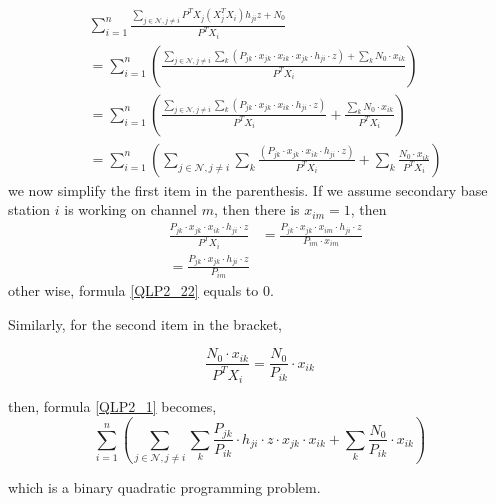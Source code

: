 \begin{appendices}
	\begin{equation}	
\label{QLP2_1}
		\begin{aligned}
		& \sum\limits^{n}_{i=1} \frac{\sum\limits_{j\in\mathcal{N}, j\neq i}P^TX_j(X_j^TX_i)h_{ji}z + N_0}{P^TX_i}\\
		& =\sum\limits^{n}_{i=1}( \frac{\sum\limits_{j\in\mathcal{N}, j\neq i}\sum\limits_k (P_{jk}\cdot x_{jk}\cdot x_{ik}\cdot x_{jk}\cdot h_{ji}\cdot z) + \sum\limits_k N_0\cdot x_{i k}}{P^TX_i})\\
		& =\sum\limits^{n}_{i=1}( \frac{\sum\limits_{j\in\mathcal{N}, j\neq i}\sum\limits_k (P_{jk}\cdot x_{jk}\cdot x_{ik}\cdot h_{ji}\cdot z)}{P^TX_i}  + \frac{\sum\limits_k N_0\cdot x_{ik}}{P^TX_i})\\
		& =\sum\limits^{n}_{i=1}( \sum\limits_{j\in\mathcal{N}, j\neq i}\sum\limits_k \frac{(P_{jk}\cdot x_{jk}\cdot x_{ik}\cdot h_{ji}\cdot z)}{P^TX_i}  + \sum\limits_k\frac{N_0\cdot x_{ik}}{P^TX_i})
		\end{aligned}
	\end{equation}
we now simplify the first item in the parenthesis. If we assume secondary base station $i$ is working on channel $m$, then there is $x_{im}=1$, then 
	\begin{equation}
\label{QLP2_22}
				\begin{aligned}
				 &\frac{P_{jk}\cdot x_{jk}\cdot x_{ik}\cdot h_{ji}\cdot z}{P^TX_i}
				 &= \frac{P_{jk}\cdot x_{jk}\cdot x_{im}\cdot h_{ji}\cdot z}{P_{im}\cdot x_{im}} \\
				 &= \frac{P_{jk}\cdot x_{jk}\cdot h_{ji}\cdot z}{P_{im}}
		 	\end{aligned}
	\end{equation}
other wise, formula \ref{QLP2_22} equals to 0.

Similarly, for the second item in the bracket,		

	\begin{equation}
\label{QLP2_4}
			\frac{N_0\cdot x_{ik}}{P^TX_i} = \frac{N_0}{P_{ik}}\cdot x_{ik}
	\end{equation}		
		
then, formula \ref{QLP2_1} becomes,
	\begin{equation}
\label{QLP2_5}
			\sum\limits^{n}_{i=1}( \sum\limits_{j\in\mathcal{N}, j\neq i}\sum\limits_k \frac{P_{jk}}{P_{ik}}\cdot h_{ji}\cdot z\cdot x_{jk}\cdot x_{ik}  + \sum\limits_k \frac{N_0}{P_{ik}}\cdot x_{ik})
		\end{equation}	

which is a binary quadratic programming problem.
\end{appendices}